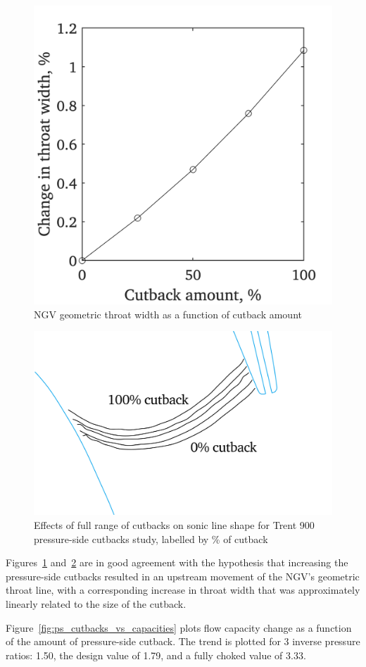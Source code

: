 \documentclass[a4paper, 11pt, oneside]{report}
\begin{document}
\begin{figure}[H]
	\centering
	\includegraphics[width=.45\textwidth]{figs/ps_cutbacks_vs_throat_widths.png}
	\caption{NGV geometric throat width as a function of cutback amount}
    \label{fig:ps_cutbacks_vs_throat_widths}
\end{figure}

\begin{figure}[H]
	\centering
	\includegraphics[width=.7\textwidth]{figs/ps_cutbacks_m1_lines_illustration.png}
	\caption{Effects of full range of cutbacks on sonic line shape for Trent 900 pressure-side cutbacks study, labelled by \% of cutback}
    \label{fig:ps_cutbacks_m1_lines_illustration}
\end{figure}

Figures~\ref{fig:ps_cutbacks_vs_throat_widths} and~\ref{fig:ps_cutbacks_m1_lines_illustration} are in good agreement with the hypothesis that increasing the pressure-side cutbacks resulted in an upstream movement of the NGV's geometric throat line, with a corresponding increase in throat width that was approximately linearly related to the size of the cutback.

Figure~\ref{fig:ps_cutbacks_vs_capacities} plots flow capacity change as a function of the amount of pressure-side cutback. The trend is plotted for 3 inverse pressure ratios: 1.50, the design value of 1.79, and a fully choked value of 3.33.
\end{document}
